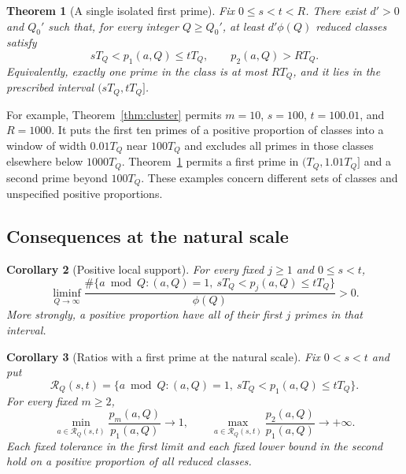 \documentclass[11pt]{article}
\newtheorem{theorem}{Theorem}[section]
\newtheorem{corollary}[theorem]{Corollary}
\theoremstyle{remark}
\numberwithin{equation}{section}
\begin{document}
\begin{theorem}[A single isolated first prime]\label{thm:single}
Fix $0\le s<t<R$. There exist $d'>0$ and $Q_0'$ such that, for
every integer $Q\ge Q_0'$, at least $d'\phi(Q)$ reduced classes satisfy
\begin{equation}\label{eq:single}
 sT_Q<p_1(a,Q)\le tT_Q,\qquad p_2(a,Q)>RT_Q.
\end{equation}
Equivalently, exactly one prime in the class is at most $RT_Q$,
and it lies in the prescribed interval $(sT_Q,tT_Q]$.
\end{theorem}

For example, Theorem~\ref{thm:cluster} permits $m=10$,
$s=100$, $t=100.01$, and $R=1000$. It puts the first ten primes
of a positive proportion of classes into a window of width
$0.01T_Q$ near $100T_Q$ and excludes all primes in those classes
elsewhere below $1000T_Q$.
Theorem~\ref{thm:single} permits a first prime in
$(T_Q,1.01T_Q]$ and a second prime beyond $100T_Q$.
These examples concern different sets of classes and unspecified
positive proportions.

\subsection{Consequences at the natural scale}

\begin{corollary}[Positive local support]\label{cor:support}
For every fixed $j\ge1$ and $0\le s<t$,
\[
 \liminf_{Q\to\infty}
 \frac{\#\{a\bmod Q:(a,Q)=1,\ sT_Q<p_j(a,Q)\le tT_Q\}}{\phi(Q)}
 >0.
\]
More strongly, a positive proportion have all of their first $j$
primes in that interval.
\end{corollary}

\begin{corollary}[Ratios with a first prime at the natural scale]
\label{cor:ratios}
Fix $0<s<t$ and put
\[
 \mathcal R_Q(s,t)=\{a\bmod Q:(a,Q)=1,\
                         sT_Q<p_1(a,Q)\le tT_Q\}.
\]
For every fixed $m\ge2$,
\begin{equation}\label{eq:ratios}
 \min_{a\in\mathcal R_Q(s,t)}\frac{p_m(a,Q)}{p_1(a,Q)}
       \longrightarrow1,
 \qquad
 \max_{a\in\mathcal R_Q(s,t)}\frac{p_2(a,Q)}{p_1(a,Q)}
       \longrightarrow+\infty.
\end{equation}
Each fixed tolerance in the first limit and each fixed lower bound
in the second hold on a positive proportion of all reduced classes.
\end{corollary}
\end{document}
